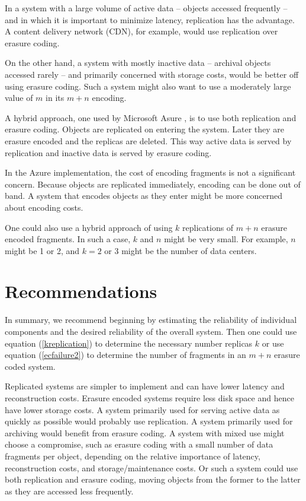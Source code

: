 \documentclass[11pt]{article}
\begin{document}
In a system with a large volume of active data -- objects accessed frequently -- and in which it is important to minimize latency, replication has the advantage. A content delivery network (CDN), for example, would use replication over erasure coding. 

On the other hand, a system with mostly inactive data -- archival objects accessed rarely -- and primarily concerned with storage costs, would be better off using erasure coding. Such a system might also want to use a moderately large value of $m$ in its $m+n$ encoding.

A hybrid approach, one used by Microsoft Asure \cite{lrc}, is to use both replication and erasure coding. Objects are replicated on entering the system. Later they are erasure encoded and the replicas are deleted. This way active data is served by replication and inactive data is served by erasure coding. 

In the Azure implementation, the cost of encoding fragments is not a significant concern. Because objects are replicated immediately, encoding can be done out of band. A system that encodes objects as they enter might be more concerned about encoding costs.

One could also use a hybrid approach of using $k$ replications of $m+n$ erasure encoded fragments. In such a case, $k$ and $n$ might be very small. For example, $n$ might be 1 or 2, and $k=2$ or 3 might be the number of data centers. 

\section{Recommendations}

In summary, we recommend beginning by estimating the reliability of individual components and the desired reliability of the overall system. Then one could use equation (\ref{kreplication}) to determine the necessary number replicas $k$ or use equation (\ref{ecfailure2}) to determine the number of fragments in an $m+n$ erasure coded system. 

Replicated systems are simpler to implement and can have lower latency and reconstruction costs. Erasure encoded systems require less disk space and hence have lower storage costs. A system primarily used for serving active data as quickly as possible would probably use replication. A system primarily used for archiving would benefit from erasure coding. A system with mixed use might choose a compromise, such as erasure coding with a small number of data fragments per object, depending on the relative importance of latency, reconstruction costs, and storage/maintenance costs. Or such a system could use both replication and erasure coding, moving objects from the former to the latter as they are accessed less frequently.
\end{document}
